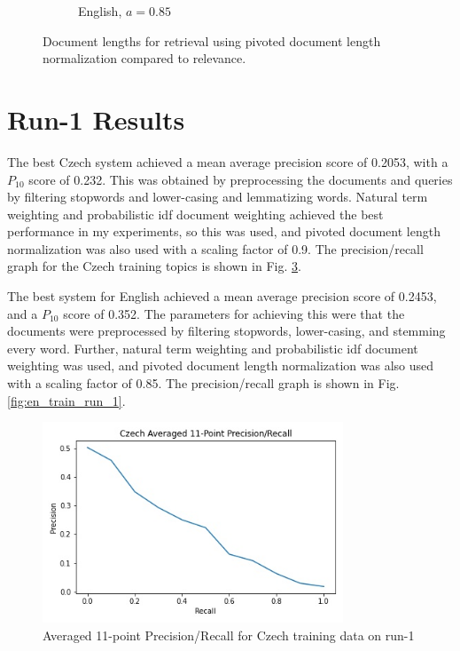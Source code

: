 \documentclass[a4paper]{article}
\begin{document}
\begin{figure}[htpb]
\begin{subfigure}{0.3\textwidth}
		\caption{English, $a = 0.85$}
		\label{fig:en_pivot}
	\end{subfigure}
	\caption{Document lengths for retrieval using pivoted document length
	normalization compared to relevance.}
	\label{fig:pivot}
\end{figure}

\section{Run-1 Results}

The best Czech system achieved a mean average precision score of 0.2053, with a
$P_{10}$ score of 0.232. This was obtained by preprocessing the documents and
queries by filtering stopwords and lower-casing and lemmatizing words. Natural
term weighting and probabilistic idf document weighting achieved the best
performance in my experiments, so this was used, and pivoted document length
normalization was also used with a scaling factor of 0.9. The precision/recall
graph for the Czech training topics is shown in Fig. \ref{fig:cs_train_run_1}.

The best system for English achieved a mean average precision score of 0.2453,
and a $P_{10}$ score of 0.352. The parameters for achieving this were that the
documents were preprocessed by filtering stopwords, lower-casing, and stemming
every word. Further, natural term weighting and probabilistic idf document
weighting was used, and pivoted document length normalization was also used
with a scaling factor of 0.85. The precision/recall graph is shown in Fig.
\ref{fig:en_train_run_1}.

\begin{figure}[htpb]
	\centering
	\includegraphics[width=0.8\textwidth]{plot_run-1_cs_precision_recall.jpg}
	\caption{Averaged 11-point Precision/Recall for Czech training data on run-1}
	\label{fig:cs_train_run_1}
\end{figure}
\end{document}
